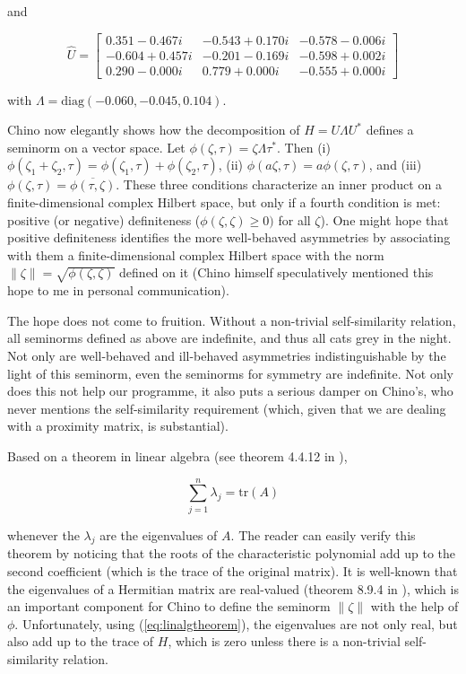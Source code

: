 \documentclass[phd,12pt,oneside]{ubcthesis}
\begin{document}
{\noindent}and

\begin{equation}
  \label{eq:dklu}
\hat{U}=\left[
      \begin{array}{ccc}
   0.351 - 0.467i & -0.543 + 0.170i & -0.578 - 0.006i \\
  -0.604 + 0.457i & -0.201 - 0.169i & -0.598 + 0.002i \\
   0.290 - 0.000i &  0.779 + 0.000i & -0.555 + 0.000i
      \end{array}
\right]
\end{equation}

{\noindent}with $\Lambda=\mbox{diag}(-0.060,-0.045,0.104)$. 

Chino now elegantly shows how the decomposition of $H=U\Lambda{}U^{*}$
defines a seminorm on a vector space. Let
$\phi(\zeta,\tau)=\zeta\Lambda\tau^{*}$. Then (i)
$\phi(\zeta_{1}+\zeta_{2},\tau)=\phi(\zeta_{1},\tau)+\phi(\zeta_{2},\tau)$,
(ii) $\phi(a\zeta,\tau)=a\phi(\zeta,\tau)$, and (iii)
$\phi(\zeta,\tau)=\overline{\phi(\tau,\zeta)}$. These three conditions
characterize an inner product on a finite-dimensional complex Hilbert
space, but only if a fourth condition is met: positive (or negative)
definiteness ($\phi(\zeta,\zeta)\geq{}0)$ for all $\zeta$). One might
hope that positive definiteness identifies the more well-behaved
asymmetries by associating with them a finite-dimensional complex
Hilbert space with the norm $\|\zeta\|=\sqrt{\phi(\zeta,\zeta)}$
defined on it (Chino himself speculatively mentioned this hope to me
in personal communication).

The hope does not come to fruition. Without a non-trivial
self-similarity relation, all seminorms defined as above are
indefinite, and thus all cats grey in the night. Not only are
well-behaved and ill-behaved asymmetries indistinguishable by the
light of this seminorm, even the seminorms for symmetry are
indefinite. Not only does this not help our programme, it also puts a
serious damper on Chino's, who never mentions the self-similarity
requirement (which, given that we are dealing with a proximity matrix,
is substantial).

Based on a theorem in linear algebra (see theorem 4.4.12 in
),

\begin{equation}
  \label{eq:linalgtheorem}
    \sum_{j=1}^{n}\lambda_{j}=\mbox{tr}(A)
\end{equation}

{\noindent}whenever the $\lambda_{j}$ are the eigenvalues of $A$. The reader can
easily verify this theorem by noticing that the roots of the
characteristic polynomial add up to the second coefficient (which is
the trace of the original matrix). It is well-known that the
eigenvalues of a Hermitian matrix are real-valued (theorem 8.9.4 in
), which is an important component for Chino
to define the seminorm $\|\zeta\|$ with the help of $\phi$.
Unfortunately, using (\ref{eq:linalgtheorem}), the eigenvalues are not
only real, but also add up to the trace of $H$, which is zero unless
there is a non-trivial self-similarity relation.
\end{document}
